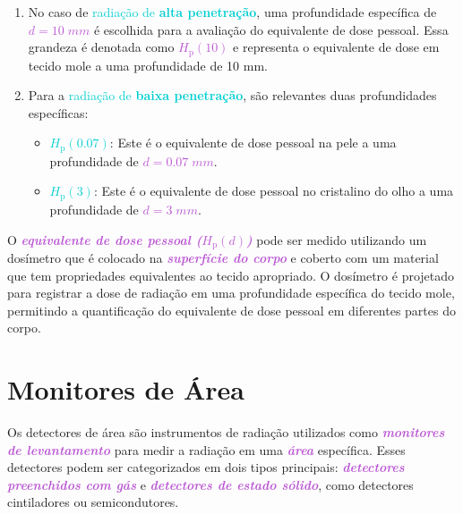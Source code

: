 \documentclass[11pt,a4paper]{article}
\begin{document}
	\begin{enumerate}
		\item No caso de \textcolor{DarkTurquoise}{radiação de \textbf{alta penetração}}, uma profundidade específica de \textcolor{MediumOrchid}{\textit{\textbf{$d = 10\; mm$}}} é escolhida para a avaliação do equivalente de dose pessoal. Essa grandeza é denotada como \textcolor{MediumOrchid}{\textit{\textbf{$H_{\text{p}}(10)$}}} e representa o equivalente de dose em tecido mole a uma profundidade de 10 mm.
		\item Para a \textcolor{DarkTurquoise}{radiação de \textbf{baixa penetração}}, são relevantes duas profundidades específicas:
		\begin{itemize}
			\item \textcolor{DarkTurquoise}{\textbf{$H_{\text{p}}(0.07)$}}: Este é o equivalente de dose pessoal na pele a uma profundidade de \textcolor{MediumOrchid}{\textit{\textbf{$d = 0.07 \; mm$}}}.
			\item \textcolor{DarkTurquoise}{\textbf{$H_{\text{p}}(3)$}}: Este é o equivalente de dose pessoal no cristalino do olho a uma profundidade de \textcolor{MediumOrchid}{\textit{\textbf{$d = 3\; mm$}}}.
		\end{itemize}
	\end{enumerate}

	O \textcolor{MediumOrchid}{\textit{\textbf{equivalente de dose pessoal ($H_{\text{p}}(d)$)}}} pode ser medido utilizando um dosímetro que é colocado na \textcolor{MediumOrchid}{\textit{\textbf{superfície do corpo}}} e coberto com um material que tem propriedades equivalentes ao tecido apropriado. O dosímetro é projetado para registrar a dose de radiação em uma profundidade específica do tecido mole, permitindo a quantificação do equivalente de dose pessoal em diferentes partes do corpo.

\section{Monitores de Área}

	Os detectores de área são instrumentos de radiação utilizados como \textcolor{MediumOrchid}{\textit{\textbf{monitores de levantamento}}} para medir a radiação em uma \textcolor{MediumOrchid}{\textit{\textbf{área}}} específica. Esses detectores podem ser categorizados em dois tipos principais: \textcolor{MediumOrchid}{\textit{\textbf{detectores preenchidos com gás}}} e \textcolor{MediumOrchid}{\textit{\textbf{detectores de estado sólido}}}, como detectores cintiladores ou semicondutores.
\end{document}
